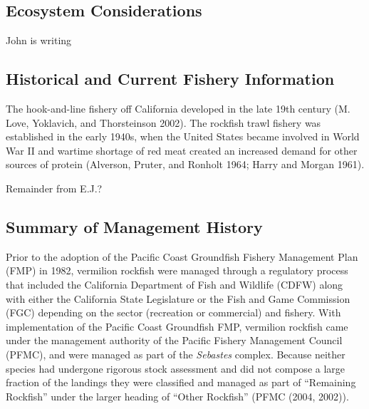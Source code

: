 \documentclass[11pt,
  english,
  a4paper,
]{article}
\begin{document}

\hypertarget{ecosystem-considerations}{%
\subsection{Ecosystem Considerations}\label{ecosystem-considerations}}

\leavevmode\tagmcend\tagstructend

John is writing


\hypertarget{historical-and-current-fishery-information}{%
\subsection{Historical and Current Fishery Information}\label{historical-and-current-fishery-information}}

\leavevmode\tagmcend\tagstructend

The hook-and-line fishery off California developed in the late 19th century {(M. Love, Yoklavich, and Thorsteinson 2002)\leavevmode\tagmcend\tagstructend}. The rockfish trawl fishery was established in the early 1940s, when the United States became involved in World War II and wartime shortage of red meat created an increased demand for other sources of protein {(Alverson, Pruter, and Ronholt 1964; Harry and Morgan 1961)\leavevmode\tagmcend\tagstructend}.

Remainder from E.J.?


\hypertarget{summary-of-management-history}{%
\subsection{Summary of Management History}\label{summary-of-management-history}}

\leavevmode\tagmcend\tagstructend

Prior to the adoption of the Pacific Coast Groundfish Fishery Management Plan (FMP) in 1982, vermilion rockfish were managed through a regulatory process that included the California Department of Fish and Wildlife (CDFW) along with either the California State Legislature or the Fish and Game Commission (FGC) depending on the sector (recreation or commercial) and fishery. With implementation of the Pacific Coast Groundfish FMP, vermilion rockfish came under the management authority of the Pacific Fishery Management Council (PFMC), and were managed as part of the \emph{Sebastes} complex. Because neither species had undergone rigorous stock assessment and did not compose a large fraction of the landings they were classified and managed as part of ``Remaining Rockfish'' under the larger heading of ``Other Rockfish'' (PFMC {(2004, 2002)\leavevmode\tagmcend\tagstructend}).
\end{document}
